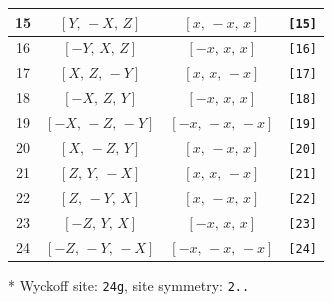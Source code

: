 \documentclass[fleqn,8pt]{jsarticle}
\begin{document}
\begin{longtable}{cccc}
15 & $\left[ Y,\, - X,\, Z \right]$ & $\left[ x,\, - x,\, x \right]$ & {\tt [15]} \\ \hline
16 & $\left[ - Y,\, X,\, Z \right]$ & $\left[ - x,\, x,\, x \right]$ & {\tt [16]} \\ \hline
17 & $\left[ X,\, Z,\, - Y \right]$ & $\left[ x,\, x,\, - x \right]$ & {\tt [17]} \\ \hline
18 & $\left[ - X,\, Z,\, Y \right]$ & $\left[ - x,\, x,\, x \right]$ & {\tt [18]} \\ \hline
19 & $\left[ - X,\, - Z,\, - Y \right]$ & $\left[ - x,\, - x,\, - x \right]$ & {\tt [19]} \\ \hline
20 & $\left[ X,\, - Z,\, Y \right]$ & $\left[ x,\, - x,\, x \right]$ & {\tt [20]} \\ \hline
21 & $\left[ Z,\, Y,\, - X \right]$ & $\left[ x,\, x,\, - x \right]$ & {\tt [21]} \\ \hline
22 & $\left[ Z,\, - Y,\, X \right]$ & $\left[ x,\, - x,\, x \right]$ & {\tt [22]} \\ \hline
23 & $\left[ - Z,\, Y,\, X \right]$ & $\left[ - x,\, x,\, x \right]$ & {\tt [23]} \\ \hline
24 & $\left[ - Z,\, - Y,\, - X \right]$ & $\left[ - x,\, - x,\, - x \right]$ & {\tt [24]} \\
\end{longtable}
* Wyckoff site: {\tt 24g}, site symmetry: {\tt 2..}
\renewcommand{\arraystretch}{1.2}
\end{document}
